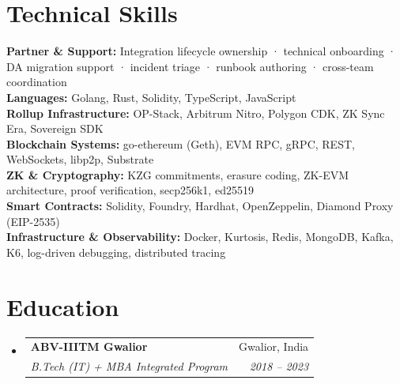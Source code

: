 \documentclass[letterpaper,11pt]{article}
\makeatletter
\newcommand{\resumeSubheading}[4]{
  \vspace{-2pt}\item
    \begin{tabular*}{0.97\textwidth}[t]{l@{\extracolsep{\fill}}r}
      \textbf{#1} & #2 \\
      \textit{\small#3} & \textit{\small #4} \\
    \end{tabular*}\vspace{-7pt}
}
\newcommand{\resumeSubHeadingListStart}{\begin{itemize}[leftmargin=0.15in, label={}]}
\newcommand{\resumeSubHeadingListEnd}{\end{itemize}}
\makeatother
\begin{document}
\section{Technical Skills}
\begin{itemize}[leftmargin=0.15in, label={}]
  \small{\item{
    \textbf{Partner \& Support:} Integration lifecycle ownership · technical onboarding · DA migration support · incident triage · runbook authoring · cross-team coordination \\
    \textbf{Languages:} Golang, Rust, Solidity, TypeScript, JavaScript \\
    \textbf{Rollup Infrastructure:} OP-Stack, Arbitrum Nitro, Polygon CDK, ZK Sync Era, Sovereign SDK \\
    \textbf{Blockchain Systems:} go-ethereum (Geth), EVM RPC, gRPC, REST, WebSockets, libp2p, Substrate \\
    \textbf{ZK \& Cryptography:} KZG commitments, erasure coding, ZK-EVM architecture, proof verification, secp256k1, ed25519 \\
    \textbf{Smart Contracts:} Solidity, Foundry, Hardhat, OpenZeppelin, Diamond Proxy (EIP-2535) \\
    \textbf{Infrastructure \& Observability:} Docker, Kurtosis, Redis, MongoDB, Kafka, K6, log-driven debugging, distributed tracing
  }}
\end{itemize}

\section{Education}
\resumeSubHeadingListStart
  \resumeSubheading
    {ABV-IIITM Gwalior}{Gwalior, India}
    {B.Tech (IT) + MBA Integrated Program}{2018 -- 2023}
\resumeSubHeadingListEnd
\end{document}

